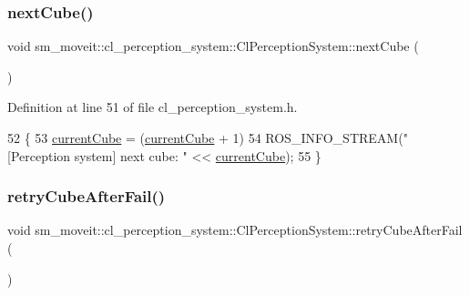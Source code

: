 \subsubsection{\texorpdfstring{next\+Cube()}{nextCube()}}
{\footnotesize\ttfamily void sm\+\_\+moveit\+::cl\+\_\+perception\+\_\+system\+::\+Cl\+Perception\+System\+::next\+Cube (\begin{DoxyParamCaption}{ }\end{DoxyParamCaption})\hspace{0.3cm}{\ttfamily [inline]}}



Definition at line 51 of file cl\+\_\+perception\+\_\+system.\+h.


\begin{DoxyCode}
52     \{
53         \hyperlink{classsm__moveit_1_1cl__perception__system_1_1ClPerceptionSystem_a0ffeadfa41480c9d4d0fcc509237dff6}{currentCube} = (\hyperlink{classsm__moveit_1_1cl__perception__system_1_1ClPerceptionSystem_a0ffeadfa41480c9d4d0fcc509237dff6}{currentCube} + 1) %
54         ROS\_INFO\_STREAM(\textcolor{stringliteral}{"[Perception system] next cube: "} << \hyperlink{classsm__moveit_1_1cl__perception__system_1_1ClPerceptionSystem_a0ffeadfa41480c9d4d0fcc509237dff6}{currentCube});
55     \}
\end{DoxyCode}
\mbox{\label{classsm__moveit_1_1cl__perception__system_1_1ClPerceptionSystem_a5ccb5cc776902a2538bd4844f529d8c1}} 
\subsubsection{\texorpdfstring{retry\+Cube\+After\+Fail()}{retryCubeAfterFail()}}
{\footnotesize\ttfamily void sm\+\_\+moveit\+::cl\+\_\+perception\+\_\+system\+::\+Cl\+Perception\+System\+::retry\+Cube\+After\+Fail (\begin{DoxyParamCaption}{ }\end{DoxyParamCaption})\hspace{0.3cm}{\ttfamily [inline]}}



